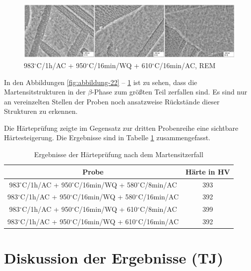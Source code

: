 \begin{figure}[h]
	\centering
	\includegraphics[width=1.0\linewidth]{./Bilder/Abbildung 25.png}
	\caption[Abbildung 25]{983$^\circ$C/1h/AC + 950$^\circ$C/16min/WQ + 610$^\circ$C/16min/AC, REM}
	\label{fig:abbildung-25}
\end{figure}

In den Abbildungen \ref{fig:abbildung-22} -- \ref{fig:abbildung-25} ist zu sehen, dass die Martensitstrukturen in der $\beta$-Phase zum größten Teil zerfallen sind. Es sind nur an vereinzelten Stellen der Proben noch ansatzweise Rückstände dieser Strukturen zu erkennen.

Die Härteprüfung zeigte im Gegensatz zur dritten Probenreihe eine sichtbare Härtesteigerung. Die Ergebnisse sind in Tabelle \ref{Tabelle 8} zusammengefasst.

\begin{table}[h]
	\centering
	\begin{tabular}{|c|c|}
		\hline 
		Probe & Härte in HV \\ 
		\hline 
		983$^\circ$C/1h/AC + 950$^\circ$C/16min/WQ + 580$^\circ$C/8min/AC & 393 \\ 
		\hline 
		983$^\circ$C/1h/AC + 950$^\circ$C/16min/WQ + 580$^\circ$C/16min/AC & 392 \\ 
		\hline 
		983$^\circ$C/1h/AC + 950$^\circ$C/16min/WQ + 610$^\circ$C/8min/AC & 399 \\ 
		\hline 
		983$^\circ$C/1h/AC + 950$^\circ$C/16min/WQ + 610$^\circ$C/16min/AC & 392 \\ 
		\hline 
	\end{tabular} 
	\caption{Ergebnisse der Härteprüfung nach dem Martensitzerfall}
	\label{Tabelle 8}
\end{table}

\section{Diskussion der Ergebnisse (TJ)}


